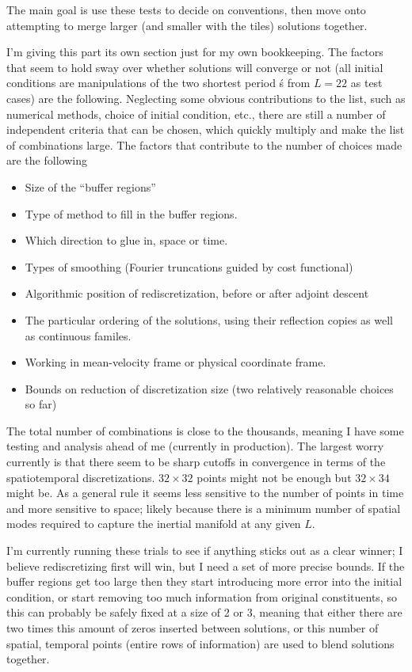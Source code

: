 \begin{description}
{\begin{description}
The main goal is use these tests to decide on conventions, then move onto attempting to merge larger (and smaller with the
tiles) solutions together.
\item[Test Battery]
I'm giving this part its own section just for my own bookkeeping. The factors that seem to hold sway
over whether solutions will converge or not (all initial conditions are manipulations of the two shortest
period \rpo\'s from $L=22$ as test cases) are the following. Neglecting some obvious contributions to the list,
such as numerical methods, choice of initial condition, etc., there are still a number of independent criteria that
can be chosen, which quickly multiply and make the list of combinations large.
The factors that contribute to the number of choices made are the following
\begin{itemize}
\item Size of the ``buffer regions''
\item Type of method to fill in the buffer regions.
\item Which direction to glue in, space or time.
\item Types of smoothing (Fourier truncations guided by cost functional)
\item Algorithmic position of rediscretization, before or after adjoint descent
\item The particular ordering of the solutions, using their reflection copies as well as continuous familes.
\item Working in mean-velocity frame or physical coordinate frame.
\item Bounds on reduction of discretization size (two relatively reasonable choices so far)
\end{itemize}
The total number of combinations is close to the thousands, meaning I have some testing and analysis ahead of me
(currently in production).
The largest worry currently is that there seem to be sharp cutoffs in convergence in terms of the spatiotemporal
discretizations. \ie $32 \times 32$ points might not be enough but $3 2\times 34$ might be. As a general rule it seems
less sensitive to the number of points in time and more sensitive to space; likely because there is a minimum number of spatial
modes required to capture the inertial manifold at any given $L$.

I'm currently running these trials to see if anything sticks out as a clear winner; I believe rediscretizing first will
win, but I need a set of more precise bounds. If the buffer regions get too large then they start introducing more error
into the initial condition, or start removing too much information from original constituents, so this can probably be
safely fixed at a size of 2 or 3, meaning that either there are two times this amount of zeros inserted between solutions,
or this number of spatial, temporal points (entire rows of information) are used to blend solutions together.


\end{description}}
\end{description}
